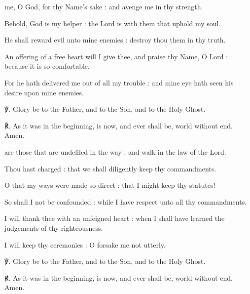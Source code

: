 \begin{multicols}{2}
 me, O God, for thy Name's sake : and avenge me in thy strength.\par
{}
Behold, God is my helper : the Lord is with them that uphold my soul.\par
{}He shall reward evil unto mine enemies : destroy thou them in thy truth.\par
{}An offering of a free heart will I give thee, and praise thy Name, O Lord : because it is so comfortable.\par
{}For he hath delivered me out of all my trouble : and mine eye hath seen his desire upon mine enemies.\par
℣. Glory be to the Father, and to the Son, and to the Holy Ghost.\par
℟. As it was in the beginning, is now, and ever shall be, world without end. Amen.

 are those that are undefiled in the way : and walk in the law of the Lord.\par
{}
Thou hast charged : that we shall diligently keep thy commandments.\par
{}O that my ways were made so direct : that I might keep thy statutes!\par
{}So shall I not be confounded : while I have respect unto all thy commandments.\par
{}I will thank thee with an unfeigned heart : when I shall have learned the judgements of thy righteousness.\par
{}I will keep thy ceremonies : O forsake me not utterly.\par
℣. Glory be to the Father, and to the Son, and to the Holy Ghost.\par
℟. As it was in the beginning, is now, and ever shall be, world without end. Amen.


\end{multicols}
